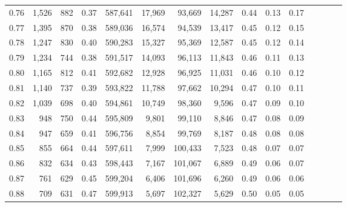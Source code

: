 \begin{tabular}{rrrcrrrrrrrrrrr}
0.76 &   1,526 &    882 &                                       0.37 &  587,641 &   17,969 &   93,669 &   14,287 &  0.44 &  0.13 &                         0.17 \\
0.77 &   1,395 &    870 &                                       0.38 &  589,036 &   16,574 &   94,539 &   13,417 &  0.45 &  0.12 &                         0.15 \\
0.78 &   1,247 &    830 &                                       0.40 &  590,283 &   15,327 &   95,369 &   12,587 &  0.45 &  0.12 &                         0.14 \\
0.79 &   1,234 &    744 &                                       0.38 &  591,517 &   14,093 &   96,113 &   11,843 &  0.46 &  0.11 &                         0.13 \\
0.80 &   1,165 &    812 &                                       0.41 &  592,682 &   12,928 &   96,925 &   11,031 &  0.46 &  0.10 &                         0.12 \\
0.81 &   1,140 &    737 &                                       0.39 &  593,822 &   11,788 &   97,662 &   10,294 &  0.47 &  0.10 &                         0.11 \\
0.82 &   1,039 &    698 &                                       0.40 &  594,861 &   10,749 &   98,360 &    9,596 &  0.47 &  0.09 &                         0.10 \\
0.83 &     948 &    750 &                                       0.44 &  595,809 &    9,801 &   99,110 &    8,846 &  0.47 &  0.08 &                         0.09 \\
0.84 &     947 &    659 &                                       0.41 &  596,756 &    8,854 &   99,769 &    8,187 &  0.48 &  0.08 &                         0.08 \\
0.85 &     855 &    664 &                                       0.44 &  597,611 &    7,999 &  100,433 &    7,523 &  0.48 &  0.07 &                         0.07 \\
0.86 &     832 &    634 &                                       0.43 &  598,443 &    7,167 &  101,067 &    6,889 &  0.49 &  0.06 &                         0.07 \\
0.87 &     761 &    629 &                                       0.45 &  599,204 &    6,406 &  101,696 &    6,260 &  0.49 &  0.06 &                         0.06 \\
0.88 &     709 &    631 &                                       0.47 &  599,913 &    5,697 &  102,327 &    5,629 &  0.50 &  0.05 &                         0.05 \\

\end{tabular}
